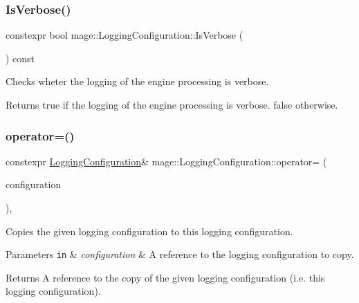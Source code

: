 \subsubsection{\texorpdfstring{Is\+Verbose()}{IsVerbose()}}
{\footnotesize\ttfamily constexpr bool mage\+::\+Logging\+Configuration\+::\+Is\+Verbose (\begin{DoxyParamCaption}{ }\end{DoxyParamCaption}) const\hspace{0.3cm}{\ttfamily [noexcept]}}

Checks wheter the logging of the engine processing is verbose.

\begin{DoxyReturn}{Returns}
{\ttfamily true} if the logging of the engine processing is verbose. {\ttfamily false} otherwise. 
\end{DoxyReturn}
\hypertarget{classmage_1_1_logging_configuration_a17aa265307f73f3c5f96e35e30c0b437}{}\label{classmage_1_1_logging_configuration_a17aa265307f73f3c5f96e35e30c0b437} 
\subsubsection{\texorpdfstring{operator=()}{operator=()}\hspace{0.1cm}{\footnotesize\ttfamily [1/2]}}
{\footnotesize\ttfamily constexpr \hyperlink{classmage_1_1_logging_configuration}{Logging\+Configuration}\& mage\+::\+Logging\+Configuration\+::operator= (\begin{DoxyParamCaption}\item[{const \hyperlink{classmage_1_1_logging_configuration}{Logging\+Configuration} \&}]{configuration }\end{DoxyParamCaption})\hspace{0.3cm}{\ttfamily [default]}, {\ttfamily [noexcept]}}

Copies the given logging configuration to this logging configuration.


\begin{DoxyParams}[1]{Parameters}
\mbox{\tt in}  & {\em configuration} & A reference to the logging configuration to copy. \\
\hline
\end{DoxyParams}
\begin{DoxyReturn}{Returns}
A reference to the copy of the given logging configuration (i.\+e. this logging configuration). 
\end{DoxyReturn}
\hypertarget{classmage_1_1_logging_configuration_aeeb70ca4119118f90c7ca4b9cb712f11}{}\label{classmage_1_1_logging_configuration_aeeb70ca4119118f90c7ca4b9cb712f11} 
